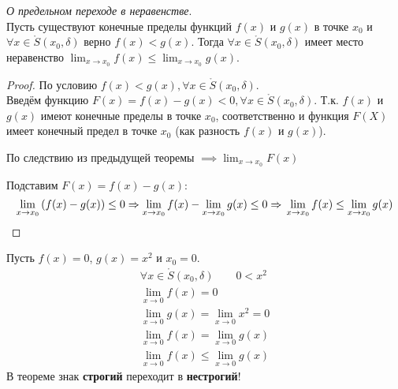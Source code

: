 \begin{theorem}
  \textit{О предельном переходе в неравенстве}. \\
  Пусть существуют конечные пределы функций $f(x)$ и  $g(x)$ в точке $x_0$ и $\forall x \in \mathring{S}(x_0, \delta)$ верно $f(x) < g(x)$. Тогда $\forall x \in \mathring{S}(x_0, \delta)$ имеет место неравенство $\lim_{x \to x_0} f(x) \le \lim_{x \to x_0} g(x)$.
\end{theorem}
\begin{proof}
  По условию $f(x) < g(x), \forall x \in \mathring{S}(x_0, \delta)$. \\
  Введём функцию $F(x) = f(x) - g(x) < 0, \forall x \in \mathring{S}(x_0, \delta)$. 
  Т.к. $f(x)$ и $g(x)$ имеют конечные пределы в точке $x_0$, соответственно и функция $F(X)$ имеет конечный предел в точке $x_0$ (как разность $f(x)$ и $g(x)$).
  
  По следствию из предыдущей теоремы
  $\implies \lim_{x \to x_0} F(x) $ 
  
  Подставим $F(x) = f(x) - g(x)$: \[
    \lim_{x \to x_0} \left( f(x) - g(x) \right) \le 0 \implies \lim_{x \to x_0} f(x) - \lim_{x \to x_0} g(x) \le 0 \implies \\
    \lim_{x \to x_0} f(x) \le \lim_{x \to x_0} g(x) 
  \]
\end{proof}
\begin{eg}
  Пусть $f(x) = 0$, $g(x) = x^2$ и $x_0 = 0$. \\
  \begin{gather*}
    \forall x \in \mathring{S}(x_0, \delta) \qquad 0 < x^2 \\
    \lim_{x \to 0} f(x) = 0 \\
    \lim_{x \to 0} g(x) = \lim_{x \to 0} x^2 = 0 \\
    \lim_{x \to 0} f(x) = \lim_{x \to 0} g(x) \\
    \lim_{x \to 0} f(x) \le \lim_{x \to 0} g(x) 
  \end{gather*}
  В теореме знак \textbf{строгий} переходит в \textbf{нестрогий}!  
\end{eg}

